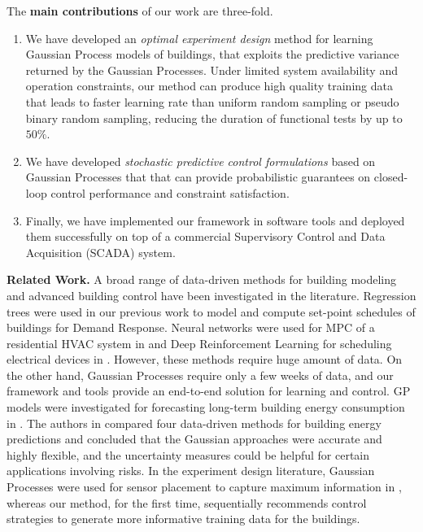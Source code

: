 The \textbf{main contributions} of our work are three-fold.
\begin{enumerate}
\item We have developed an \emph{optimal experiment design} method for learning Gaussian Process models of buildings, that exploits the predictive variance returned by the Gaussian Processes.  Under limited system availability and operation constraints, our method can produce high quality training data that leads to faster learning rate than uniform random sampling or pseudo binary random sampling, reducing the duration of functional tests by up to \(50\%\).
\item We have developed \emph{stochastic predictive control formulations} based on Gaussian Processes that that can provide probabilistic guarantees on closed-loop control performance and constraint satisfaction.
\item Finally, we have implemented our framework in software tools and deployed them successfully on top of a commercial Supervisory Control and Data Acquisition (SCADA) system.
\end{enumerate}


\noindent\textbf{Related Work.}
A broad range of data-driven methods for building modeling and advanced building control have been investigated in the literature.
Regression trees were used in our previous work \cite{JainCDC2017} to model and compute set-point schedules of buildings for Demand Response.
Neural networks were used for MPC of a residential HVAC system in \cite{Afram2017} and Deep Reinforcement Learning for scheduling electrical devices in \cite{Mocanu2017}.
However, these methods require huge amount of data. 
On the other hand, Gaussian Processes require only a few weeks of data, and our framework and tools provide an end-to-end solution for learning and control.
GP models were investigated for forecasting long-term building energy consumption in \cite{nohetal13data}.
The authors in \cite{zhangetal15comparisons} compared four data-driven methods for building energy predictions and concluded that the Gaussian approaches were accurate and highly flexible, and the uncertainty measures could be helpful for certain applications involving risks.
In the experiment design literature, Gaussian Processes were used for sensor placement to capture maximum information in \cite{Krause2008}, whereas our method, for the first time, sequentially recommends control strategies to generate more informative training data for the buildings.


